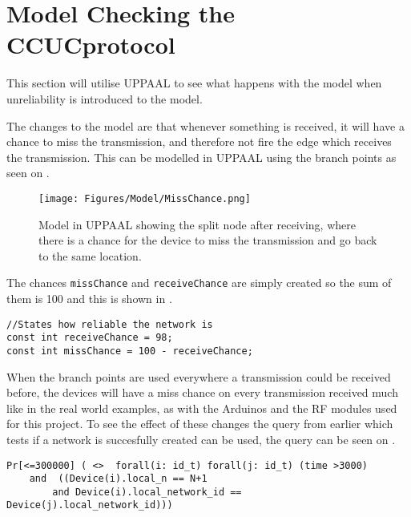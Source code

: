 \section{Model Checking the CCUCprotocol}
This section will utilise UPPAAL to see what happens with the model when unreliability is introduced to the model.

The changes to the model are that whenever something is received, it will have a chance to miss the transmission, and therefore not fire the edge which receives the transmission.
This can be modelled in UPPAAL using the branch points as seen on .

\begin{wrapfigure}{R}{0.3\textwidth}
\centering
  \texttt{[image: Figures/Model/MissChance.png]} 
\caption{Model in UPPAAL showing the split node after receiving, where there is a chance for the device to miss the transmission and go back to the same location.}
\label{fig:missTransmission}
\end{wrapfigure}

The chances \texttt{missChance} and \texttt{receiveChance} are simply created so the sum of them is 100 and this is shown in .

\begin{lstlisting}[style=UPPAAL, caption={Specifying the realiability of the transmissions, the current numbers result in a 2\% miss chance.}, label={unreliability-UPPAAL}]
//States how reliable the network is
const int receiveChance = 98;
const int missChance = 100 - receiveChance;
\end{lstlisting}

When the branch points are used everywhere a transmission could be received before, the devices will have a miss chance on every transmission received much like in the real world examples, as with the Arduinos and the RF modules used for this project.
To see the effect of these changes the query from earlier which tests if a network is succesfully created can be used, the query can be seen on .

\begin{lstlisting}[style=UPPAAL, caption={Query for UPPAAL which asks for the probability of all devices in a network being equal to the number of devices in the system, and that they all have the same \texttt{network\_id}}, label={query-SuccesfulCreate}]
Pr[<=300000] ( <>  forall(i: id_t) forall(j: id_t) (time >3000) 
	and  ((Device(i).local_n == N+1 
		and Device(i).local_network_id == Device(j).local_network_id)))
\end{lstlisting}

